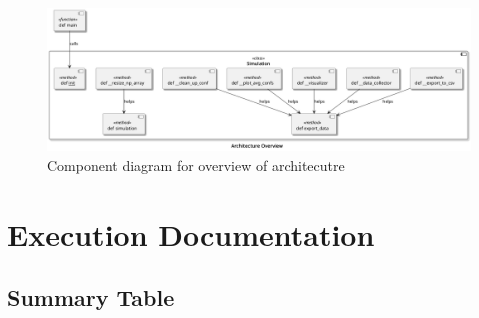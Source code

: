\documentclass{article}
\begin{document}
\begin{figure}[H]
  \includegraphics[scale=0.3]{B-1.png}
  \caption{Component diagram for overview of architecutre}
\end{figure}

\section{Execution Documentation}
\subsection{Summary Table}
\end{document}
